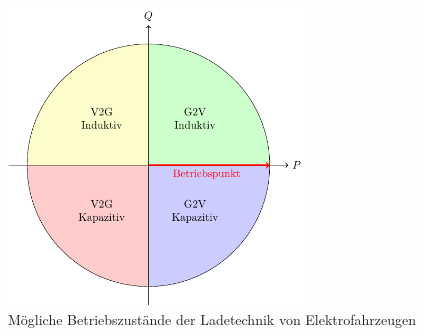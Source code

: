 \begin{figure}[H]
    \centering
    \includegraphics[width=0.7\textwidth]{Bilder/four-quadrant_operation}
    \caption{Mögliche Betriebszustände der Ladetechnik von Elektrofahrzeugen \cite{He2020}}\label{fig:four-quadrant}
\end{figure}